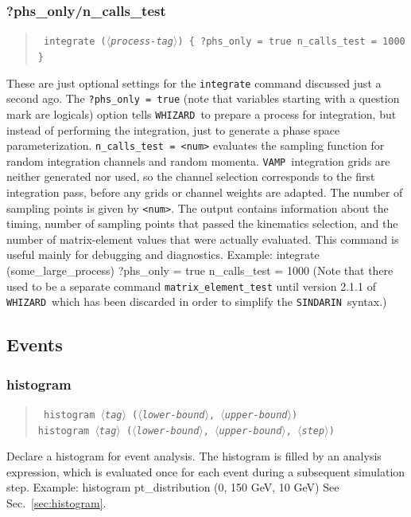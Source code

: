 \documentclass[12pt]{book}
\newenvironment{code}%
  {\begingroup\footnotesize
   \quote
   \Verbatim}%
  {\endVerbatim
   \endquote
   \endgroup\noindent}
\newenvironment{syntax}%
  {\begin{quote}
   \begin{flushleft}\tt}%
  {\end{flushleft}
   \end{quote}}
\newcommand{\var}[1]{$\langle$\textit{#1}$\rangle$}
\newcommand{\ttt}[1]{\texttt{#1}}
\newcommand{\whizard}{\ttt{WHIZARD}}
\newcommand{\vamp}{\ttt{VAMP}}
\newcommand{\sindarin}{\ttt{SINDARIN}}
\begin{document}
\subsubsection{?phs\_only/n\_calls\_test}
\begin{syntax}
integrate (\var{process-tag}) \{ ?phs\_only = true  n\_calls\_test = 1000 \}
\end{syntax}
These are just optional settings for the \ttt{integrate} command
discussed just a second ago. The \ttt{?phs\_only = true} (note that
variables starting with a question mark are logicals) option tells
\whizard\ to prepare a process for integration, but instead of
performing the integration, just to generate a phase space
parameterization. \ttt{n\_calls\_test = <num>} evaluates the sampling
function for random integration channels and random momenta.  \vamp\
integration grids are neither generated nor used, so the channel
selection corresponds to the first integration pass, before any grids
or channel weights are adapted.  The number of sampling points is
given by \verb|<num>|. The output contains information about the
timing, number of sampling points that passed the kinematics
selection, and the number of matrix-element values that were actually
evaluated. This command is useful mainly for debugging and
diagnostics.  Example:
\begin{code}
integrate (some_large_process) { ?phs_only = true  n_calls_test = 1000 }
\end{code}
(Note that there used to be a separate command
\ttt{matrix\_element\_test} until version 2.1.1 of \whizard\ which has
been discarded in order to simplify the \sindarin\ syntax.)

\subsection{Events}

\subsubsection{histogram}
\begin{syntax}
histogram \var{tag} (\var{lower-bound}, \var{upper-bound}) \\
histogram \var{tag} (\var{lower-bound}, \var{upper-bound}, \var{step}) \\
\end{syntax}
Declare a histogram for event analysis.  The histogram is filled by an
analysis expression, which is evaluated once for each event during a
subsequent simulation step.  Example:
\begin{code}
histogram pt_distribution (0, 150 GeV, 10 GeV)
\end{code}
See Sec.~\ref{sec:histogram}.
\end{document}
